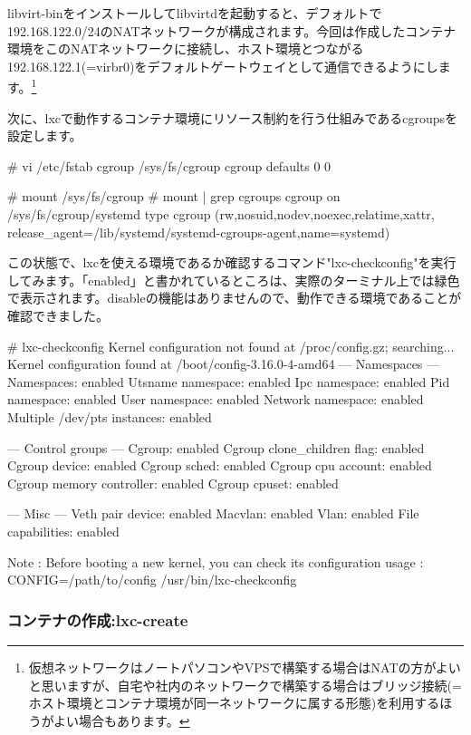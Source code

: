 \documentclass[mingoth,a4paper]{jsarticle}
\begin{document}
libvirt-binをインストールしてlibvirtdを起動すると、デフォルトで192.168.122.0/24のNATネットワークが構成されます。今回は作成したコンテナ環境をこのNATネットワークに接続し、ホスト環境とつながる192.168.122.1(=virbr0)をデフォルトゲートウェイとして通信できるようにします。\footnote{仮想ネットワークはノートパソコンやVPSで構築する場合はNATの方がよいと思いますが、自宅や社内のネットワークで構築する場合はブリッジ接続(=ホスト環境とコンテナ環境が同一ネットワークに属する形態)を利用するほうがよい場合もあります。}


次に、lxcで動作するコンテナ環境にリソース制約を行う仕組みであるcgroupsを設定します。

\begin{commandline}
  # vi /etc/fstab
  cgroup  /sys/fs/cgroup  cgroup  defaults  0   0

  # mount /sys/fs/cgroup
  # mount | grep cgroups
  cgroup on /sys/fs/cgroup/systemd type cgroup (rw,nosuid,nodev,noexec,relatime,xattr,
  release_agent=/lib/systemd/systemd-cgroups-agent,name=systemd)
\end{commandline}

この状態で、lxcを使える環境であるか確認するコマンド"lxc-checkconfig"を実行してみます。「enabled」と書かれているところは、実際のターミナル上では緑色で表示されます。disableの機能はありませんので、動作できる環境であることが確認できました。

\begin{commandline}
  # lxc-checkconfig
  Kernel configuration not found at /proc/config.gz; searching...
  Kernel configuration found at /boot/config-3.16.0-4-amd64
  --- Namespaces ---
  Namespaces: enabled
  Utsname namespace: enabled
  Ipc namespace: enabled
  Pid namespace: enabled
  User namespace: enabled
  Network namespace: enabled
  Multiple /dev/pts instances: enabled

  --- Control groups ---
  Cgroup: enabled
  Cgroup clone_children flag: enabled
  Cgroup device: enabled
  Cgroup sched: enabled
  Cgroup cpu account: enabled
  Cgroup memory controller: enabled
  Cgroup cpuset: enabled

  --- Misc ---
  Veth pair device: enabled
  Macvlan: enabled
  Vlan: enabled
  File capabilities: enabled

  Note : Before booting a new kernel, you can check its configuration
  usage : CONFIG=/path/to/config /usr/bin/lxc-checkconfig
\end{commandline}

\subsubsection{コンテナの作成:lxc-create}
\end{document}

